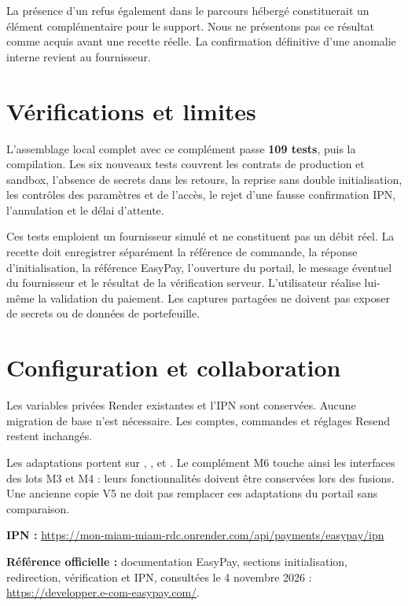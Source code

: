 \documentclass[11pt,a4paper]{article}
\begin{document}
La présence d'un refus également dans le parcours hébergé constituerait un élément complémentaire pour le support. Nous ne présentons pas ce résultat comme acquis avant une recette réelle. La confirmation définitive d'une anomalie interne revient au fournisseur.

\section{Vérifications et limites}
L'assemblage local complet avec ce complément passe \textbf{109 tests}, puis la compilation. Les six nouveaux tests couvrent les contrats de production et sandbox, l'absence de secrets dans les retours, la reprise sans double initialisation, les contrôles des paramètres et de l'accès, le rejet d'une fausse confirmation IPN, l'annulation et le délai d'attente.

Ces tests emploient un fournisseur simulé et ne constituent pas un débit réel. La recette doit enregistrer séparément la référence de commande, la réponse d'initialisation, la référence EasyPay, l'ouverture du portail, le message éventuel du fournisseur et le résultat de la vérification serveur. L'utilisateur réalise lui-même la validation du paiement. Les captures partagées ne doivent pas exposer de secrets ou de données de portefeuille.

\section{Configuration et collaboration}
Les variables privées Render existantes et l'IPN sont conservées. Aucune migration de base n'est nécessaire. Les comptes, commandes et réglages Resend restent inchangés.

Les adaptations portent sur , ,  et . Le complément M6 touche ainsi les interfaces des lots M3 et M4 : leurs fonctionnalités doivent être conservées lors des fusions. Une ancienne copie V5 ne doit pas remplacer ces adaptations du portail sans comparaison.

\textbf{IPN :} \url{https://mon-miam-miam-rdc.onrender.com/api/payments/easypay/ipn}

\textbf{Référence officielle :} documentation EasyPay, sections initialisation, redirection, vérification et IPN, consultées le 4 novembre 2026 : \url{https://developper.e-com-easypay.com/}.
\end{document}
